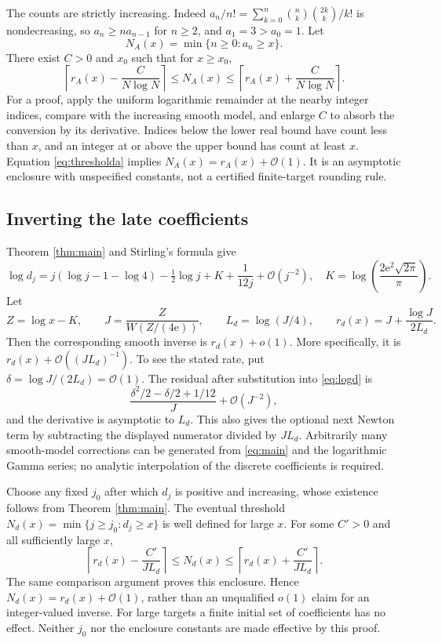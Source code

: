\documentclass[11pt,letterpaper]{article}
\numberwithin{equation}{section}
\theoremstyle{remark}\newtheorem{remark}[theorem]{Remark}
\newcommand{\e}{\mathrm e}
\newcommand{\Ord}{\mathcal O}
\begin{document}
The counts are strictly increasing. Indeed
$a_n/n!=\sum_{k=0}^n\binom nk\binom{2k}k/k!$ is nondecreasing, so $a_n\ge n a_{n-1}$ for $n\ge2$, and $a_1=3>a_0=1$. Let
\[
 N_A(x)=\min\{n\ge0:a_n\ge x\}.
\]
There exist $C>0$ and $x_0$ such that for $x\ge x_0$,
\begin{equation}\label{eq:thresholda}
 \left\lceil r_A(x)-\frac C{N\log N}\right\rceil
 \le N_A(x)\le
 \left\lceil r_A(x)+\frac C{N\log N}\right\rceil.
\end{equation}
For a proof, apply the uniform logarithmic remainder at the nearby integer indices, compare with the increasing smooth model, and enlarge $C$ to absorb the conversion by its derivative. Indices below the lower real bound have count less than $x$, and an integer at or above the upper bound has count at least $x$. Equation \eqref{eq:thresholda} implies $N_A(x)=r_A(x)+\Ord(1)$. It is an asymptotic enclosure with unspecified constants, not a certified finite-target rounding rule.

\subsection{Inverting the late coefficients}
Theorem \ref{thm:main} and Stirling's formula give
\begin{equation}\label{eq:logd}
 \log d_j=j(\log j-1-\log4)-\tfrac12\log j+K+
                  \frac1{12j}+\Ord(j^{-2}),
 \quad K=\log\!\left(\frac{2\e^2\sqrt{2\pi}}\pi\right).
\end{equation}
Let
\begin{equation}\label{eq:J}
 Z=\log x-K,\qquad J=\frac Z{W(Z/(4\e))},\qquad
 L_d=\log(J/4),\qquad
 r_d(x)=J+\frac{\log J}{2L_d}.
\end{equation}
Then the corresponding smooth inverse is $r_d(x)+o(1)$. More specifically, it is $r_d(x)+\Ord((J L_d)^{-1})$. To see the stated rate, put $\delta=\log J/(2L_d)=\Ord(1)$. The residual after substitution into \eqref{eq:logd} is
\[
 \frac{\delta^2/2-\delta/2+1/12}{J}+\Ord(J^{-2}),
\]
and the derivative is asymptotic to $L_d$. This also gives the optional next Newton term by subtracting the displayed numerator divided by $J L_d$. Arbitrarily many smooth-model corrections can be generated from \eqref{eq:main} and the logarithmic Gamma series; no analytic interpolation of the discrete coefficients is required.

Choose any fixed $j_0$ after which $d_j$ is positive and increasing, whose existence follows from Theorem \ref{thm:main}. The eventual threshold
$N_d(x)=\min\{j\ge j_0:d_j\ge x\}$ is well defined for large $x$. For some $C'>0$ and all sufficiently large $x$,
\begin{equation}\label{eq:thresholdd}
 \left\lceil r_d(x)-\frac{C'}{J L_d}\right\rceil
 \le N_d(x)\le
 \left\lceil r_d(x)+\frac{C'}{J L_d}\right\rceil.
\end{equation}
The same comparison argument proves this enclosure. Hence $N_d(x)=r_d(x)+\Ord(1)$, rather than an unqualified $o(1)$ claim for an integer-valued inverse. For large targets a finite initial set of coefficients has no effect. Neither $j_0$ nor the enclosure constants are made effective by this proof.
\end{document}
